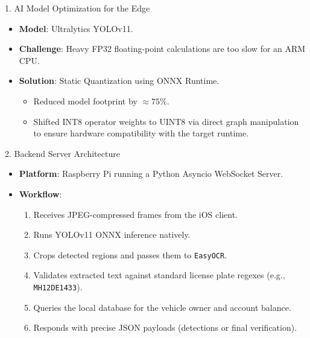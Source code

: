 \documentclass{beamer}
\begin{document}
\begin{frame}{1. AI Model Optimization for the Edge}
    \begin{itemize}
        \item \textbf{Model}: Ultralytics YOLOv11.
        \item \textbf{Challenge}: Heavy FP32 floating-point calculations are too slow for an ARM CPU.
        \item \textbf{Solution}: Static Quantization using ONNX Runtime.
        \begin{itemize}
            \item Reduced model footprint by $\approx 75\%$.
            \item Shifted INT8 operator weights to UINT8 via direct graph manipulation to ensure hardware compatibility with the target runtime.
        \end{itemize}
    \end{itemize}
\end{frame}

\begin{frame}{2. Backend Server Architecture}
    \begin{itemize}
        \item \textbf{Platform}: Raspberry Pi running a Python Asyncio WebSocket Server.
        \item \textbf{Workflow}:
        \begin{enumerate}
            \item Receives JPEG-compressed frames from the iOS client.
            \item Runs YOLOv11 ONNX inference natively.
            \item Crops detected regions and passes them to \texttt{EasyOCR}.
            \item Validates extracted text against standard license plate regexes (e.g., \texttt{MH12DE1433}).
            \item Queries the local database for the vehicle owner and account balance.
            \item Responds with precise JSON payloads (detections or final verification).
        \end{enumerate}
    \end{itemize}
\end{frame}
\end{document}
